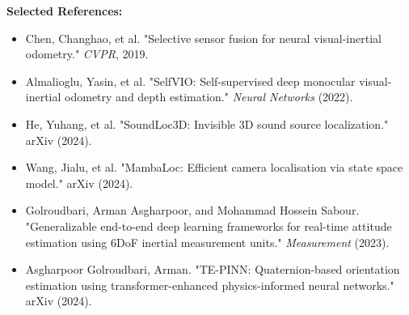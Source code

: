 \documentclass[12pt]{article}
\begin{document}
\vspace{0.5cm}
\noindent\textbf{Selected References:}

\begin{itemize}
\item Chen, Changhao, et al. "Selective sensor fusion for neural visual-inertial odometry." \textit{CVPR}, 2019.

\item Almalioglu, Yasin, et al. "SelfVIO: Self-supervised deep monocular visual-inertial odometry and depth estimation." \textit{Neural Networks} (2022).

\item He, Yuhang, et al. "SoundLoc3D: Invisible 3D sound source localization." arXiv (2024).

\item Wang, Jialu, et al. "MambaLoc: Efficient camera localisation via state space model." arXiv (2024).

\item Golroudbari, Arman Asgharpoor, and Mohammad Hossein Sabour. "Generalizable end-to-end deep learning frameworks for real-time attitude estimation using 6DoF inertial measurement units." \textit{Measurement} (2023).

\item Asgharpoor Golroudbari, Arman. "TE-PINN: Quaternion-based orientation estimation using transformer-enhanced physics-informed neural networks." arXiv (2024).
\end{itemize}
\end{document}
